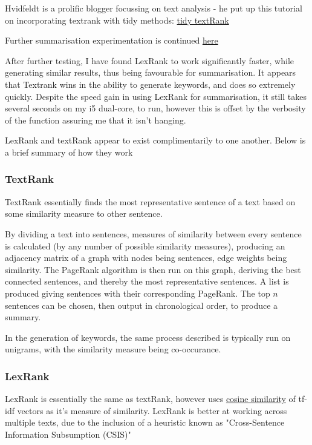 \documentclass[a4paper, 11pt]{article}
\begin{document}
Hvidfeldt is a prolific blogger focussing on text analysis - he put up
this tutorial on incorporating textrank with tidy methods: \href{https://www.hvitfeldt.me/blog/tidy-text-summarization-using-textrank/}{tidy
textRank}

Further summarisation experimentation is continued \href{summarisation\_experimentation.Rmd}{here}

After further testing, I have found LexRank to work significantly
faster, while generating similar results, thus being favourable for
summarisation. It appears that Textrank wins in the ability to
generate keywords, and does so extremely quickly. Despite the speed
gain in using LexRank for summarisation, it still takes several
seconds on my i5 dual-core, to run, however this is offset by the
verbosity of the function assuring me that it isn't hanging.

LexRank and textRank appear to exist complimentarily to one another.
Below is a brief summary of how they work

\subsubsection{TextRank}
\label{sec:org36906f0}

TextRank essentially finds the most representative sentence of a text
based on some similarity measure to other sentence.

By dividing a text into sentences, measures of similarity between every
sentence is calculated (by any number of possible similarity measures),
producing an adjacency matrix of a graph with nodes being sentences,
edge weights being similarity. The PageRank algorithm is then run on
this graph, deriving the best connected sentences, and thereby the most
representative sentences. A list is produced giving sentences with their
corresponding PageRank. The top \(n\) sentences can be chosen, then output
in chronological order, to produce a summary.

In the generation of keywords, the same process described is typically
run on unigrams, with the similarity measure being co-occurance.

\subsubsection{LexRank}
\label{sec:orgac11a63}
LexRank is essentially the same as textRank, however uses
\href{https://en.wikipedia.org/wiki/Cosine\_similarity}{cosine similarity} of tf-idf vectors as it's measure of similarity. LexRank is better at
working across multiple texts, due to the inclusion of a heuristic known
as "Cross-Sentence Information Subsumption (CSIS)"
\end{document}
